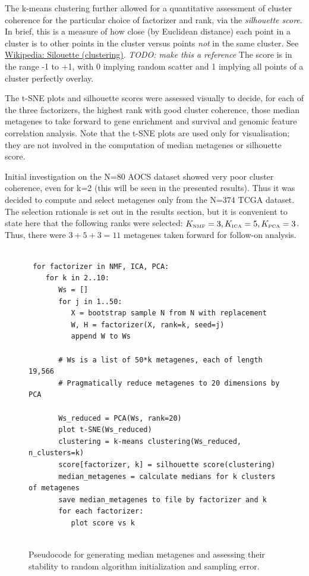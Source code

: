 \documentclass[draft,tikz, 12pt,a4paper,oneside,fleqn]{article}
\begin{document}
The k-means clustering further allowed for a quantitative assessment of cluster coherence for the particular choice of factorizer and rank, via the \emph{silhouette score}.  In brief, this is a measure of how close (by Euclidean distance) each point in a cluster is to other points in the cluster versus points \emph{not} in the same cluster.  See 
\href{https://en.wikipedia.org/wiki/Silhouette_(clustering)}{Wikipedia: Silouette (clustering)}.
\emph{TODO: make this a reference}
The score is in the range -1 to +1, with 0 implying random scatter and 1 implying all points of a cluster perfectly overlay.

The t-SNE plots and silhouette scores were assessed visually to decide, for each of the three factorizers, the highest rank with good cluster coherence, those median metagenes to take forward to gene enrichment and survival and genomic feature correlation analysis.   
Note that the t-SNE plots are used only for visualisation; they are not involved in the computation of median metagenes or silhouette score.

Initial investigation on the N=80 AOCS dataset showed very poor cluster coherence, even for k=2 (this will be seen in the presented results).   Thus it was decided to compute and select metagenes only from the N=374 TCGA dataset.   
The selection rationale is set out in the results section, but it is convenient to state here that the following ranks were selected:
$K_{\mbox{\tiny NMF}} = 3, K_{\mbox{\tiny ICA}} = 5, K_{\mbox{\tiny PCA}} =3$.  Thus, there were $3 + 5 + 3 = 11$ metagenes taken forward for follow-on analysis.

\begin{figure}[htb!]
\begin{center}
\begin{Verbatim}[baselinestretch=1, frame=single, rulecolor=\color{blue}, label=Metagene Stability Assessment, fontfamily=courier, fontsize=\small]

 for factorizer in NMF, ICA, PCA:
    for k in 2..10:
       Ws = []
       for j in 1..50:
          X = bootstrap sample N from N with replacement
          W, H = factorizer(X, rank=k, seed=j)
          append W to Ws
   	     
       # Ws is a list of 50*k metagenes, each of length 19,566
       # Pragmatically reduce metagenes to 20 dimensions by PCA
   	  
       Ws_reduced = PCA(Ws, rank=20)
       plot t-SNE(Ws_reduced)
       clustering = k-means clustering(Ws_reduced, n_clusters=k)
       score[factorizer, k] = silhouette score(clustering)	  
       median_metagenes = calculate medians for k clusters of metagenes
       save median_metagenes to file by factorizer and k
       for each factorizer:
          plot score vs k
      
\end{Verbatim}
\end{center}
\caption{Pseudocode for generating median metagenes and assessing their stability to random algorithm initialization and sampling error.}
\label{fig-clustering-psuedocode}
\end{figure}
\end{document}
